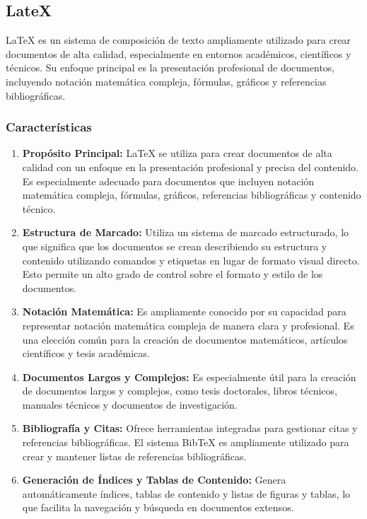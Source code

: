 \documentclass[letterpaper]{article}
\begin{document}
\subsection{LateX}
LaTeX es un sistema de composición de texto ampliamente utilizado para crear documentos de alta calidad, especialmente
en entornos académicos, científicos y técnicos. Su enfoque principal es la presentación profesional de documentos,
incluyendo notación matemática compleja, fórmulas, gráficos y referencias bibliográficas.

\subsubsection{Características}
\begin{enumerate}[series=listWWNumxvii,label=\arabic*.,ref=\arabic*]
\item \textbf{Propósito Principal:} LaTeX se utiliza para crear documentos de alta calidad con un enfoque en la
presentación profesional y precisa del contenido. Es especialmente adecuado para documentos que incluyen notación
matemática compleja, fórmulas, gráficos, referencias bibliográficas y contenido técnico.
\item \textbf{Estructura de Marcado:} Utiliza un sistema de marcado estructurado, lo que significa que los documentos se
crean describiendo su estructura y contenido utilizando comandos y etiquetas en lugar de formato visual directo. Esto
permite un alto grado de control sobre el formato y estilo de los documentos.
\item \textbf{Notación Matemática:} Es ampliamente conocido por su capacidad para representar notación matemática
compleja de manera clara y profesional. Es una elección común para la creación de documentos matemáticos, artículos
científicos y tesis académicas.
\item \textbf{Documentos Largos y Complejos:} Es especialmente útil para la creación de documentos largos y complejos,
como tesis doctorales, libros técnicos, manuales técnicos y documentos de investigación.
\item \textbf{Bibliografía y Citas:} Ofrece herramientas integradas para gestionar citas y referencias bibliográficas.
El sistema BibTeX es ampliamente utilizado para crear y mantener listas de referencias bibliográficas.
\item \textbf{Generación de Índices y Tablas de Contenido:} Genera automáticamente índices, tablas de contenido y listas
de figuras y tablas, lo que facilita la navegación y búsqueda en documentos extensos.

\end{enumerate}
\end{document}
